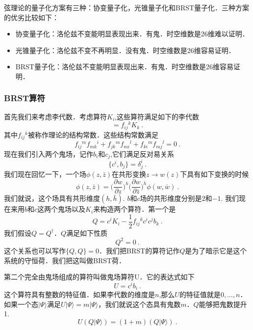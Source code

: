 
弦理论的量子化方案有三种：协变量子化，光锥量子化和BRST量子化．三种方案的优劣比较如下：
\begin{itemize}
\item 协变量子化：洛伦兹不变能明显表现出来．有鬼．时空维数是26维难以证明．
\item 光锥量子化：洛伦兹不变不再明显．没有鬼．时空维数是26维容易证明．
\item BRST量子化：洛伦兹不变能明显表现出来．有鬼．时空维数是26维容易证明．
\end{itemize}
\subsubsection{BRST算符}
首先我们来考虑李代数．考虑算符$K_i$,这些算符满足如下的李代数
\begin{equation}
[K_i,K_j] = f_{ij}{}^k K_k~.
\end{equation}
其中$f_{ij}{}^k$被称作理论的结构常数．这些结构常数满足
\begin{equation}
f_{ij}{}^m f_{mk}{}^i + f_{jk}{}^m f_{mi}{}^l+f_{ki}{}^m f_{mj}{}^l = 0 ~. 
\end{equation}
现在我们引入两个鬼场，记作$b_i$和$c_j$,它们满足反对易关系
\begin{equation}\label{BRST_eq5}
\{ c^i, b_j \} = \delta^i_j~.
\end{equation}
我们现在回忆一下，一个场$\phi(z,\bar z)$在共形变换$z\rightarrow w(z)$下具有如下变换的时候
\begin{equation}
\phi(z,\bar z) = \bigg( \frac{\partial w}{\partial z} \bigg)^h \bigg( \frac{\partial w}{\partial \bar z} \bigg)^{\bar h} \phi (w,\bar w)~.
\end{equation}
我们就说，这个场具有共形维度$(h,\bar h)$. $b$和$c$场的共形维度分别是$2$和$-1$. 我们现在来用$b$和$c$这两个鬼场以及$K_i$来构造两个算符．第一个是
\begin{equation}
Q = c^i K_i - \frac{1}{2} f_{ij}{}^k c^i c^j b_k~.
\end{equation}
我们假设$Q = Q^\dagger$．$Q$满足如下性质
\begin{equation}
Q^2 = 0~.
\end{equation}
这个关系也可以写作$\{Q,Q\}=0$．我们把BRST的算符记作$Q$是为了暗示它是这个系统的守恒荷．我们把这叫做BRST荷．

第二个完全由鬼场组成的算符叫做鬼场算符U．它的表达式如下
\begin{equation}\label{BRST_eq1}
U = c^i b_i~.
\end{equation}
这个算符具有整数的特征值．如果李代数的维度是$n$,那么$U$的特征值就是$0,\ldots ,n$．如果一个态$|\Psi\rangle$满足$U|\Psi\rangle=m|\Psi\rangle$，我们就说这个态具有鬼数$m$．$Q$能够把鬼数提升1.
\begin{equation}
U (Q|\Psi\rangle) = (1+m) (Q|\Psi\rangle)~. 
\end{equation}
